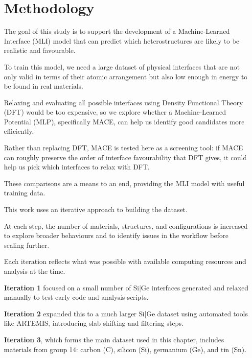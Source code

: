 \section{Methodology} \label{section:methodology}


The goal of this study is to support the development of a Machine-Learned Interface (MLI) model that can predict which
heterostructures are likely to be realistic and favourable.

To train this model, we need a large dataset of physical interfaces that are not only valid in terms of their atomic
arrangement but also low enough in energy to be found in real materials.

Relaxing and evaluating all possible interfaces using Density Functional Theory (DFT) would be too expensive, so we
explore whether a Machine-Learned Potential (MLP), specifically MACE, can help us identify good candidates more
efficiently.


Rather than replacing DFT, MACE is tested here as a screening tool: if MACE can roughly preserve the order of interface
favourability that DFT gives, it could help us pick which interfaces to relax with DFT.

These comparisons are a means to an end, providing the MLI model with useful training data.


This work uses an iterative approach to building the dataset.

At each step, the number of materials, structures, and configurations is increased to explore broader behaviours and to
identify issues in the workflow before scaling further.

Each iteration reflects what was possible with available computing resources and analysis at the time.


\textbf{Iteration 1} focused on a small number of Si|Ge interfaces generated and relaxed manually to test early code and
analysis scripts.


\textbf{Iteration 2} expanded this to a much larger Si|Ge dataset using automated tools like ARTEMIS, introducing slab
shifting and filtering steps.


\textbf{Iteration 3}, which forms the main dataset used in this chapter, includes materials from group 14: carbon (C),
silicon (Si), germanium (Ge), and tin (Sn).

